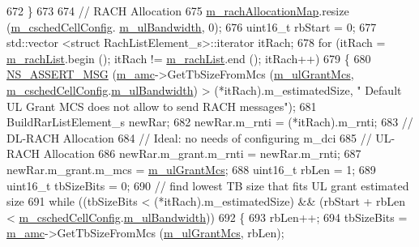 \begin{DoxyCode}
672     \}
673 
674   \textcolor{comment}{// RACH Allocation}
675   \hyperlink{classns3_1_1FdBetFfMacScheduler_ac11ac1d239d1b52e4d7778b6265050f8}{m\_rachAllocationMap}.resize (\hyperlink{classns3_1_1FdBetFfMacScheduler_a52a10018d36c6a2e69820346a327dfc9}{m\_cschedCellConfig}.
      \hyperlink{structns3_1_1FfMacCschedSapProvider_1_1CschedCellConfigReqParameters_a5ab5b102878e6e7e7727a14af4a64d2f}{m\_ulBandwidth}, 0);
676   uint16\_t rbStart = 0;
677   std::vector <struct RachListElement\_s>::iterator itRach;
678   \textcolor{keywordflow}{for} (itRach = \hyperlink{classns3_1_1FdBetFfMacScheduler_a561288dcd0f30666e1ea6fe6166f30b4}{m\_rachList}.begin (); itRach != \hyperlink{classns3_1_1FdBetFfMacScheduler_a561288dcd0f30666e1ea6fe6166f30b4}{m\_rachList}.end (); itRach++)
679     \{
680       \hyperlink{assert_8h_aff5ece9066c74e681e74999856f08539}{NS\_ASSERT\_MSG} (\hyperlink{classns3_1_1FdBetFfMacScheduler_ab6734e88a03f8d5085607802a0b49bbb}{m\_amc}->GetTbSizeFromMcs (\hyperlink{classns3_1_1FdBetFfMacScheduler_ae614305b8694d0ad588967a9fb653870}{m\_ulGrantMcs}, 
      \hyperlink{classns3_1_1FdBetFfMacScheduler_a52a10018d36c6a2e69820346a327dfc9}{m\_cschedCellConfig}.\hyperlink{structns3_1_1FfMacCschedSapProvider_1_1CschedCellConfigReqParameters_a5ab5b102878e6e7e7727a14af4a64d2f}{m\_ulBandwidth}) > (*itRach).m\_estimatedSize, \textcolor{stringliteral}{" Default UL
       Grant MCS does not allow to send RACH messages"});
681       BuildRarListElement\_s newRar;
682       newRar.m\_rnti = (*itRach).m\_rnti;
683       \textcolor{comment}{// DL-RACH Allocation}
684       \textcolor{comment}{// Ideal: no needs of configuring m\_dci}
685       \textcolor{comment}{// UL-RACH Allocation}
686       newRar.m\_grant.m\_rnti = newRar.m\_rnti;
687       newRar.m\_grant.m\_mcs = \hyperlink{classns3_1_1FdBetFfMacScheduler_ae614305b8694d0ad588967a9fb653870}{m\_ulGrantMcs};
688       uint16\_t rbLen = 1;
689       uint16\_t tbSizeBits = 0;
690       \textcolor{comment}{// find lowest TB size that fits UL grant estimated size}
691       \textcolor{keywordflow}{while} ((tbSizeBits < (*itRach).m\_estimatedSize) && (rbStart + rbLen < 
      \hyperlink{classns3_1_1FdBetFfMacScheduler_a52a10018d36c6a2e69820346a327dfc9}{m\_cschedCellConfig}.\hyperlink{structns3_1_1FfMacCschedSapProvider_1_1CschedCellConfigReqParameters_a5ab5b102878e6e7e7727a14af4a64d2f}{m\_ulBandwidth}))
692         \{
693           rbLen++;
694           tbSizeBits = \hyperlink{classns3_1_1FdBetFfMacScheduler_ab6734e88a03f8d5085607802a0b49bbb}{m\_amc}->GetTbSizeFromMcs (\hyperlink{classns3_1_1FdBetFfMacScheduler_ae614305b8694d0ad588967a9fb653870}{m\_ulGrantMcs}, rbLen);

\end{DoxyCode}
